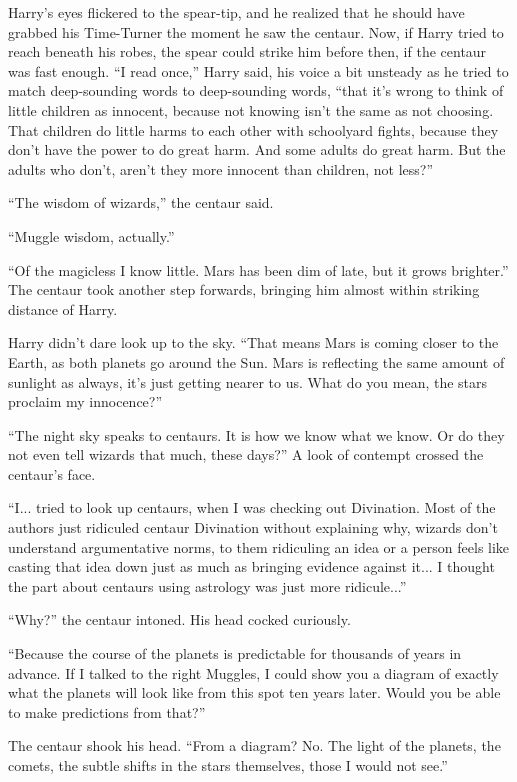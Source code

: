 Harry's eyes flickered to the spear-tip, and he realized that he should
have grabbed his Time-Turner the moment he saw the centaur. Now, if
Harry tried to reach beneath his robes, the spear could strike him
before then, if the centaur was fast enough. ``I read once,'' Harry
said, his voice a bit unsteady as he tried to match deep-sounding words
to deep-sounding words, ``that it's wrong to think of little children as
innocent, because not knowing isn't the same as not choosing. That
children do little harms to each other with schoolyard fights, because
they don't have the power to do great harm. And some adults do great
harm. But the adults who don't, aren't they more innocent than children,
not less?''

``The wisdom of wizards,'' the centaur said.

``Muggle wisdom, actually.''

``Of the magicless I know little. Mars has been dim of late, but it
grows brighter.'' The centaur took another step forwards, bringing him
almost within striking distance of Harry.

Harry didn't dare look up to the sky. ``That means Mars is coming closer
to the Earth, as both planets go around the Sun. Mars is reflecting the
same amount of sunlight as always, it's just getting nearer to us. What
do you mean, the stars proclaim my innocence?''

``The night sky speaks to centaurs. It is how we know what we know. Or
do they not even tell wizards that much, these days?'' A look of
contempt crossed the centaur's face.

``I... tried to look up centaurs, when I was checking out
Divination. Most of the authors just ridiculed centaur Divination
without explaining why, wizards don't understand argumentative norms, to
them ridiculing an idea or a person feels like casting that idea down
just as much as bringing evidence against it... I thought the part
about centaurs using astrology was just more ridicule...''

``Why?'' the centaur intoned. His head cocked curiously.

``Because the course of the planets is predictable for thousands of
years in advance. If I talked to the right Muggles, I could show you a
diagram of exactly what the planets will look like from this spot ten
years later. Would you be able to make predictions from that?''

The centaur shook his head. ``From a diagram? No. The light of the
planets, the comets, the subtle shifts in the stars themselves, those I
would not see.''

